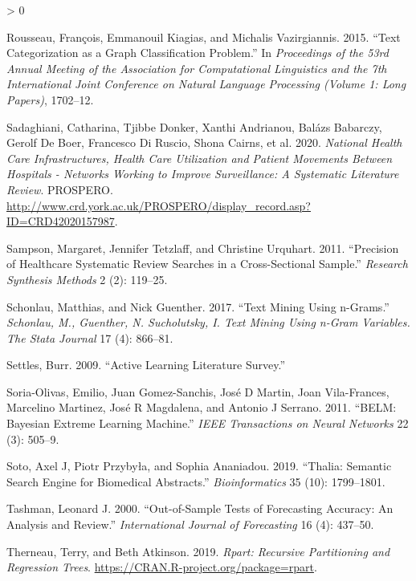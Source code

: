 \documentclass{article}
\newlength{\cslhangindent}
\newenvironment{CSLReferences}[2] %
 {%
  \setlength{\parindent}{0pt}
  \ifodd #1 \everypar{\setlength{\hangindent}{\cslhangindent}}\ignorespaces\fi
  \ifnum #2 > 0
  \setlength{\parskip}{#2\baselineskip}
  \fi
 }%
 {}
\begin{document}
\begin{CSLReferences}{1}{0}
\leavevmode\hypertarget{ref-rousseau2015text}{}%
Rousseau, François, Emmanouil Kiagias, and Michalis Vazirgiannis. 2015.
{``Text Categorization as a Graph Classification Problem.''} In
\emph{Proceedings of the 53rd Annual Meeting of the Association for
Computational Linguistics and the 7th International Joint Conference on
Natural Language Processing (Volume 1: Long Papers)}, 1702--12.

\leavevmode\hypertarget{ref-newis}{}%
Sadaghiani, Catharina, Tjibbe Donker, Xanthi Andrianou, Balázs Babarczy,
Gerolf De Boer, Francesco Di Ruscio, Shona Cairns, et al. 2020.
\emph{National Health Care Infrastructures, Health Care Utilization and
Patient Movements Between Hospitals - Networks Working to Improve
Surveillance: A Systematic Literature Review}. PROSPERO.
\url{http://www.crd.york.ac.uk/PROSPERO/display_record.asp?ID=CRD42020157987}.

\leavevmode\hypertarget{ref-sampson2011precision}{}%
Sampson, Margaret, Jennifer Tetzlaff, and Christine Urquhart. 2011.
{``Precision of Healthcare Systematic Review Searches in a
Cross-Sectional Sample.''} \emph{Research Synthesis Methods} 2 (2):
119--25.

\leavevmode\hypertarget{ref-schonlau2017text}{}%
Schonlau, Matthias, and Nick Guenther. 2017. {``Text Mining Using
n-Grams.''} \emph{Schonlau, M., Guenther, N. Sucholutsky, I. Text Mining
Using n-Gram Variables. The Stata Journal} 17 (4): 866--81.

\leavevmode\hypertarget{ref-settles2009active}{}%
Settles, Burr. 2009. {``Active Learning Literature Survey.''}

\leavevmode\hypertarget{ref-soria2011belm}{}%
Soria-Olivas, Emilio, Juan Gomez-Sanchis, José D Martin, Joan
Vila-Frances, Marcelino Martinez, José R Magdalena, and Antonio J
Serrano. 2011. {``BELM: Bayesian Extreme Learning Machine.''} \emph{IEEE
Transactions on Neural Networks} 22 (3): 505--9.

\leavevmode\hypertarget{ref-soto2019thalia}{}%
Soto, Axel J, Piotr Przybyła, and Sophia Ananiadou. 2019. {``Thalia:
Semantic Search Engine for Biomedical Abstracts.''}
\emph{Bioinformatics} 35 (10): 1799--1801.

\leavevmode\hypertarget{ref-tashman2000out}{}%
Tashman, Leonard J. 2000. {``Out-of-Sample Tests of Forecasting
Accuracy: An Analysis and Review.''} \emph{International Journal of
Forecasting} 16 (4): 437--50.

\leavevmode\hypertarget{ref-rpart}{}%
Therneau, Terry, and Beth Atkinson. 2019. \emph{Rpart: Recursive
Partitioning and Regression Trees}.
\url{https://CRAN.R-project.org/package=rpart}.


\end{CSLReferences}
\end{document}
